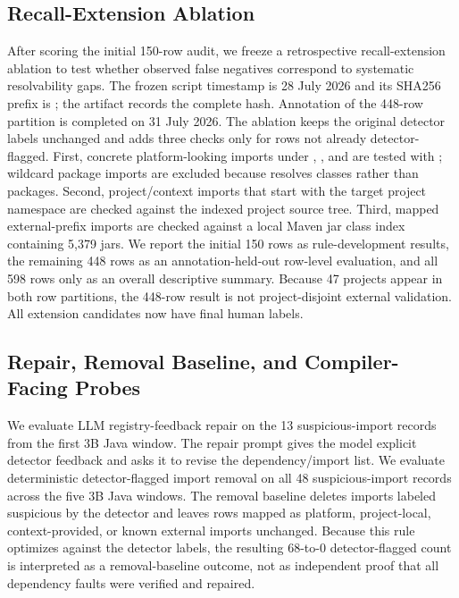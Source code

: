 \documentclass[pdflatex,sn-basic]{sn-jnl}
\newcommand{\codeid}[1]{\texttt{\detokenize{#1}}}
\begin{document}
\subsection{Recall-Extension Ablation}

After scoring the initial 150-row audit, we freeze a retrospective recall-extension ablation to test whether observed false negatives correspond to systematic resolvability gaps. The frozen script timestamp is 28 July 2026 and its SHA256 prefix is \codeid{F6CB9130168C68AB}; the artifact records the complete hash. Annotation of the 448-row partition is completed on 31 July 2026. The ablation keeps the original detector labels unchanged and adds three checks only for rows not already detector-flagged. First, concrete platform-looking imports under \codeid{java.*}, \codeid{javax.*}, and \codeid{jdk.*} are tested with \codeid{javap}; wildcard package imports are excluded because \codeid{javap} resolves classes rather than packages. Second, project/context imports that start with the target project namespace are checked against the indexed project source tree. Third, mapped external-prefix imports are checked against a local Maven jar class index containing 5,379 jars. We report the initial 150 rows as rule-development results, the remaining 448 rows as an annotation-held-out row-level evaluation, and all 598 rows only as an overall descriptive summary. Because 47 projects appear in both row partitions, the 448-row result is not project-disjoint external validation. All extension candidates now have final human labels.

\subsection{Repair, Removal Baseline, and Compiler-Facing Probes}

We evaluate LLM registry-feedback repair on the 13 suspicious-import records from the first 3B Java window. The repair prompt gives the model explicit detector feedback and asks it to revise the dependency/import list. We evaluate deterministic detector-flagged import removal on all 48 suspicious-import records across the five 3B Java windows. The removal baseline deletes imports labeled suspicious by the detector and leaves rows mapped as platform, project-local, context-provided, or known external imports unchanged. Because this rule optimizes against the detector labels, the resulting 68-to-0 detector-flagged count is interpreted as a removal-baseline outcome, not as independent proof that all dependency faults were verified and repaired.
\end{document}
